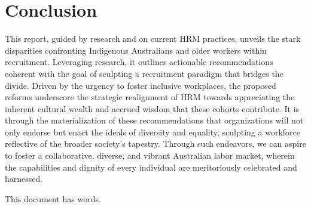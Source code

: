 \documentclass{article}
\begin{document}
\clearpage
\section{Conclusion}
This report, guided by research and on current HRM practices, unveils the stark disparities confronting Indigenous Australians and older workers within recruitment. Leveraging research, it outlines actionable recommendations coherent with the goal of sculpting a recruitment paradigm that bridges the divide. Driven by the urgency to foster inclusive workplaces, the proposed reforms underscore the strategic realignment of HRM towards appreciating the inherent cultural wealth and accrued wisdom that these cohorts contribute. It is through the materialization of these recommendations that organizations will not only endorse but enact the ideals of diversity and equality, sculpting a workforce reflective of the broader society’s tapestry. Through such endeavors, we can aspire to foster a collaborative, diverse, and vibrant Australian labor market, wherein the capabilities and dignity of every individual are meritoriously celebrated and harnessed.

\clearpage
\printbibliography
\clearpage
This document has \emph{\bashStdout} words.
\end{document}
